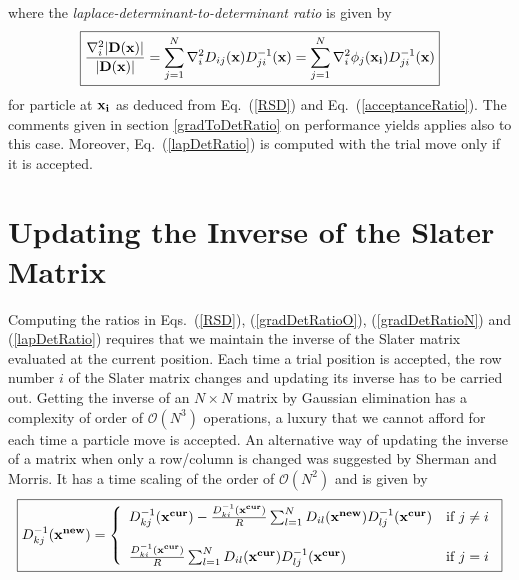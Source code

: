 where the \emph{laplace-determinant-to-determinant ratio} is given by 
\begin{equation}\label{lapDetRatio}
 \boxed{\frac{\nabla_{i}^{2}|{\bf D}({\bf x})|}{|{\bf D}({\bf x})|} = \sum_{j=1}^{N} \nabla_{i}^{2} D_{ij}({\bf x}) D_{ji}^{-1}({\bf x}) = \sum_{j=1}^{N} \nabla_{i}^{2}\phi_j({\bf x_i}) D_{ji}^{-1}({\bf x})}
\end{equation}
for particle at ${\bf x_i}$ as deduced from Eq.~(\ref{RSD}) and Eq.~(\ref{acceptanceRatio}). The comments given in section \ref{gradToDetRatio} on performance yields applies also to this case. Moreover, Eq.~(\ref{lapDetRatio}) is computed with the trial move only if it is accepted.


\section{Updating the Inverse of the Slater Matrix}
Computing the ratios in Eqs.~(\ref{RSD}), (\ref{gradDetRatioO}), (\ref{gradDetRatioN}) and (\ref{lapDetRatio}) requires that we maintain the inverse of the Slater matrix evaluated at the current position. Each time a trial position is accepted, the row number $i$ of the Slater matrix changes and updating its inverse has to be carried out. Getting the inverse of an $N \times N$ matrix by Gaussian elimination has a complexity of order of $\mathcal{O}(N^3)$ operations, a luxury that we 
cannot afford for each time a particle move is accepted. An alternative way of updating the inverse of a matrix when only a row/column is changed was suggested by Sherman and Morris. %
It has a time scaling of the order of  $\mathcal{O}(N^2)$ \cite{abinitio, needs1996, ceperley1977} and is given by
\begin{eqnarray}\label{updatingInverse}
\boxed{D^{-1}_{kj}({\bf x^{new}})  = \left\{ 
\begin{array}{l l}
  D^{-1}_{kj}({\bf x^{cur}}) - \frac{D^{-1}_{ki}({\bf x^{cur}})}{R} \sum_{l=1}^{N} D_{il}({\bf x^{new}})  D^{-1}_{lj}({\bf x^{cur}}) & \mbox{if $j \neq i$}\nonumber \\ \\
 \frac{D^{-1}_{ki}({\bf x^{cur}})}{R} \sum_{l=1}^{N} D_{il}({\bf x^{cur}}) D^{-1}_{lj}({\bf x^{cur}}) & \mbox{if $j=i$}
\end{array} \right.}\\
\end{eqnarray}

